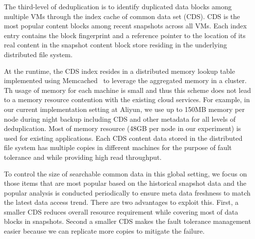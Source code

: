 The third-level of deduplication is to identify duplicated data blocks among multiple VMs through the index cache
of common data set (CDS).  CDS is the most popular content blocks 
among  recent snapshots across all VMs. 
Each index entry contains  the block fingerprint and a reference pointer to the location of its real content
in the snapshot content block store residing in the underlying distributed file system.

At the runtime, the CDS index resides in a distributed  memory lookup table  
implemented using Memcached~\cite{memcached} to leverage the aggregated memory in a cluster.
Th usage of memory for each machine is small and thus  this scheme  does not
lead to  a memory resource contention with the existing cloud services.
For example, in our current implementation setting at Aliyun, we use up to  150MB memory per node during night backup
including CDS and other metadata for all levels of deduplication. Most of memory resource (48GB per node 
in our experiment) is used for existing  applications.
Each CDS content data stored  in the distributed file system
has multiple copies in different machines for the purpose of fault tolerance and 
while providing high read  throughput.  



To control the size of searchable common data in this global setting, we focus on those items that 
are most popular based on the historical snapshot data and the popular analysis is conducted periodically to ensure 
meta data freshness to match the latest data access trend.
There are two advantages to exploit this.
First, a smaller CDS reduces overall resource requirement while covering  most of data blocks in snapshots.
Second a smaller CDS makes the fault tolerance management  easier because we can replicate  more copies
to mitigate the failure.


